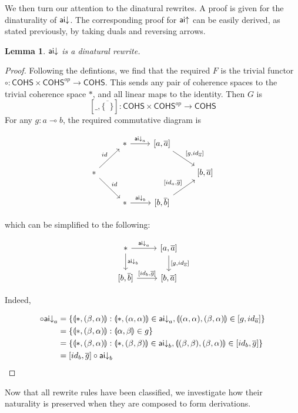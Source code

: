 \documentclass[11pt, oneside]{article}
\theoremstyle{plain}
\newtheorem{lemma}[theorem]{Lemma}
\theoremstyle{definition}
\newcommand{\lp}{\llparenthesis}
\newcommand{\rp}{\rrparenthesis}
\newcommand{\cohs}{{\mathsf{COHS}}}
\newcommand{\comp}{\mathbin{\circ}}
\newcommand{\unit}{\circ}
\begin{document}
We then turn our attention to the dinatural rewrites.
A proof is given for the dinaturality of ${\mathsf {ai}}{\downarrow}$.
The corresponding proof for ${\mathsf {ai}}{ \uparrow}$ can be easily derived, as stated previously, by taking duals and reversing arrows.
\begin{lemma}
${\mathsf {ai}}{\downarrow}$ is a dinatural rewrite.
\end{lemma}
\begin{proof}
Following the defintions, we find that the required $F$ is the trivial functor $\unit:\cohs\times\cohs^{op}\to\cohs$.
This sends any pair of coherence spaces to the trivial coherence space $*$, and all linear maps to the identity.
Then $G$ is
$$[\_,\overline{\{\enspace\}}]:\cohs\times\cohs^{op}\to\cohs$$
For any $g:a\multimap b$, the required commutative diagram is

\[
\begin{tikzcd}
    & * \arrow[r,"\aiD_{a}"] & {[a,\overline{a}]} \arrow[rd,"{[g,id_{\overline{a}}]}"] \\
    * \arrow[ru,"id"] \arrow[rd,"id"] &&& {[b,\overline{a}]} \\
    & * \arrow[r,"\aiD_{b}"] & {[b,\overline{b}]} \arrow[ru,"{[id_a,\overline{g}]}"]
\end{tikzcd}
\]

which can be simplified to the following:

\[
\begin{tikzcd}
    * \arrow[r, "\aiD_{a}"]\arrow[d,"\aiD_{b}"] & {[a,\overline{a}]} \arrow[d,"{[g,id_{\overline{a}}]}"] \\
    {[b,\overline{b}]} \arrow[r,"{[id_b,\overline{g}]}"] & {[b,\overline{a}]}
\end{tikzcd}
\]

Indeed,

\begin{align*}
    [g,id_{\overline{a}}]\comp\aiD_{a} &= \{\lp*,(\beta,\alpha)\rp:\lp*,(\alpha,\alpha)\rp\in \aiD_{a},\lp(\alpha,\alpha),(\beta,\alpha)\rp\in[g,id_{\overline{a}}]\} \\
    &= \{\lp*,(\beta,\alpha)\rp:\lp\alpha,\beta\rp\in g\} \\
    &= \{\lp*,(\beta,\alpha)\rp:\lp*,(\beta,\beta)\rp\in \aiD_{b},\lp(\beta,\beta),(\beta,\alpha)\rp\in[id_{b},\overline{g}]\}\\
    &= [id_b,\overline{g}]\comp\aiD_{b}
\end{align*}
\end{proof}

Now that all rewrite rules have been classified, we investigate how their naturality is preserved when they are composed to form derivations.
\end{document}
